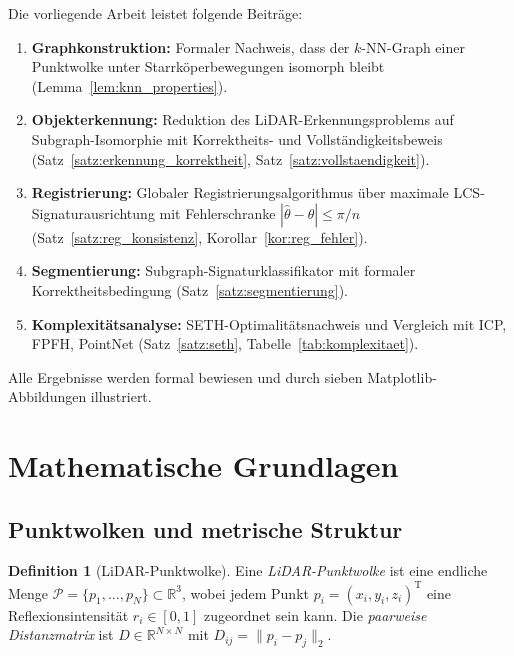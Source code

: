 ﻿\documentclass[a4paper,12pt]{article}
\theoremstyle{definition}
\newtheorem{definition}{Definition}[section]
\begin{document}
Die vorliegende Arbeit leistet folgende Beiträge:
\begin{enumerate}
  \item \textbf{Graphkonstruktion:} Formaler Nachweis, dass der
        $k$-NN-Graph einer Punktwolke unter Starrköperbewegungen
        isomorph bleibt (Lemma~\ref{lem:knn_properties}).
  \item \textbf{Objekterkennung:} Reduktion des LiDAR-Erkennungsproblems
        auf Subgraph-Isomorphie mit Korrektheits- und Vollständigkeitsbeweis
        (Satz~\ref{satz:erkennung_korrektheit},
        Satz~\ref{satz:vollstaendigkeit}).
  \item \textbf{Registrierung:} Globaler Registrierungsalgorithmus über
        maximale LCS-Signaturausrichtung mit Fehlerschranke
        $|\hat\theta - \theta| \leq \pi/n$
        (Satz~\ref{satz:reg_konsistenz}, Korollar~\ref{kor:reg_fehler}).
  \item \textbf{Segmentierung:} Subgraph-Signaturklassifikator mit
        formaler Korrektheitsbedingung
        (Satz~\ref{satz:segmentierung}).
  \item \textbf{Komplexitätsanalyse:} SETH-Optimalitätsnachweis und
        Vergleich mit ICP, FPFH, PointNet
        (Satz~\ref{satz:seth}, Tabelle~\ref{tab:komplexitaet}).
\end{enumerate}

Alle Ergebnisse werden formal bewiesen und durch sieben
Matplotlib-Abbildungen illustriert.

\section{Mathematische Grundlagen}

\subsection{Punktwolken und metrische Struktur}

\begin{definition}[LiDAR-Punktwolke]
  \label{def:punktwolke}
  Eine \emph{LiDAR-Punktwolke} ist eine endliche Menge
  $\mathcal{P} = \{p_1, \ldots, p_N\} \subset \mathbb{R}^3$,
  wobei jedem Punkt $p_i = (x_i, y_i, z_i)^{\mathrm{T}}$ eine
  Reflexionsintensität $r_i \in [0,1]$ zugeordnet sein kann.
  Die \emph{paarweise Distanzmatrix} ist
  $D \in \mathbb{R}^{N \times N}$ mit $D_{ij} = \|p_i - p_j\|_2$.
\end{definition}
\end{document}
